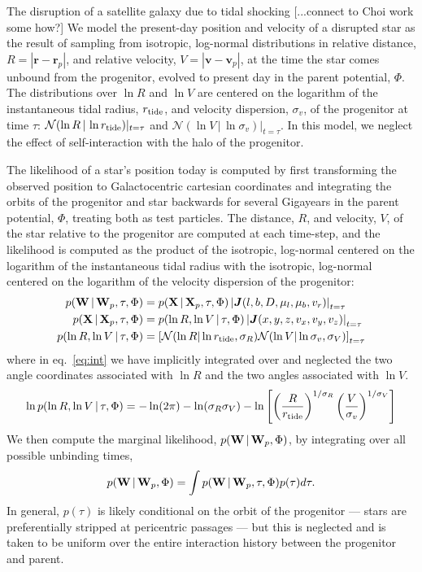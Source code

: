 \documentclass[letterpaper,12pt,preprint]{aastex}
\newcommand{\given}{\,|\,}
\newcommand{\jac}[1]{\left\vert \J{#1} \right\vert}
\newcommand{\D}{{\bf D}}
\newcommand{\W}{{\bf W}}
\newcommand{\X}{{\bf X}}
\newcommand{\J}{{\boldsymbol J}}
\newcommand{\rtide}{r_{\rm tide}}
\newcommand{\bsr}{\boldsymbol r}
\newcommand{\bsv}{\boldsymbol v}
\begin{document}
The disruption of a satellite galaxy due to tidal shocking [...connect to Choi work some how?] We model the present-day position and velocity of a disrupted star as the result of sampling from isotropic, log-normal distributions in relative distance, $R=\left\vert \bsr-\bsr_p \right\vert$, and relative velocity, $V=\left\vert \bsv-\bsv_p \right\vert$, at the time the star comes unbound from the progenitor, evolved to present day in the parent potential, $\Phi$. The distributions over $\ln R$ and $\ln V$ are centered on the logarithm of the instantaneous tidal radius, $\rtide$, and velocity dispersion, $\sigma_v$, of the progenitor at time $\tau$: $\mathcal{N}(\ln R \given \ln\rtide)\vert_{t=\tau}$ and $\mathcal{N}(\ln V \given \ln \sigma_v)\vert_{t=\tau}$. In this model, we neglect the effect of self-interaction with the halo of the progenitor. 

The likelihood of a star's position today is computed by first transforming the observed position to Galactocentric cartesian coordinates and integrating the orbits of the progenitor and star backwards for several Gigayears in the parent potential, $\Phi$, treating both as test particles. The distance, $R$, and velocity, $V$, of the star relative to the progenitor are computed at each time-step, and the likelihood is computed as the product of the isotropic, log-normal centered on the logarithm of the instantaneous tidal radius with the isotropic, log-normal centered on the logarithm of the velocity dispersion of the progenitor:
\begin{align}
	p(\W \given \W_p, \tau, \Phi) &= p(\X \given \X_p, \tau, \Phi) \jac{(l,b,D,\mu_l,\mu_b,v_r)}_{t=\tau}\\
	p(\X \given \X_p, \tau, \Phi) &= p(\ln R, \ln V \given \tau, \Phi) \jac{(x,y,z,v_x,v_y,v_z)}_{t=\tau}\label{eq:int} \\
	p(\ln R, \ln V \given \tau, \Phi) &= \left[\mathcal{N}(\ln R | \ln \rtide, \sigma_R)\mathcal{N}(\ln V | \ln \sigma_v, \sigma_V)\right]_{t=\tau}
\end{align}
where in eq.~\ref{eq:int} we have implicitly integrated over and neglected the two angle coordinates associated with $\ln R$ and the two angles associated with $\ln V$. 
\begin{align}
	\ln p(\ln R, \ln V \given \tau, \Phi) = -\ln(2\pi)-\ln(\sigma_R\sigma_V)-
		\ln\left[\left(\frac{R}{\rtide}\right)^{1/\sigma_R} \left(\frac{V}{\sigma_v}\right)^{1/\sigma_V}\right]
\end{align}
We then compute the marginal likelihood, $p(\W \given \W_p, \Phi)$, by integrating over all possible unbinding times,
\begin{align}
	p(\W \given \W_p, \Phi) = \int p(\W \given \W_p, \tau, \Phi)p(\tau) d\tau.
\end{align}
In general, $p(\tau)$ is likely conditional on the orbit of the progenitor --- stars are preferentially stripped at pericentric passages --- but this is neglected and is taken to be uniform over the entire interaction history between the progenitor and parent. 
\end{document}
